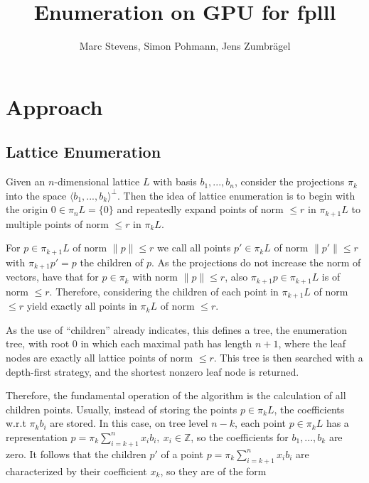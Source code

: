 \documentclass{scrartcl}
\title{Enumeration on GPU for fplll}
\author{Marc Stevens, Simon Pohmann, Jens Zumbrägel}
\newcommand{\Z}{\mathbb{Z}}
\begin{document}
    \maketitle

    \section{Approach}

    \subsection{Lattice Enumeration}

    Given an $n$-dimensional lattice $L$ with basis $b_1, ..., b_n$, consider the projections $\pi_k$ into the space $\langle b_1, ..., b_k \rangle^\perp$. Then the idea of lattice enumeration is to begin with the origin $0 \in \pi_n L = \{ 0 \}$ and repeatedly expand points of norm $\leq r$ in $\pi_{k + 1} L$ to multiple points of norm $\leq r$ in $\pi_k L$.
    
    For $p \in \pi_{k + 1} L$ of norm $\| p \| \leq r$ we call all points $p' \in \pi_k L$ of norm $\| p' \| \leq r$ with $\pi_{k + 1} p' = p$ the children of $p$. As the projections do not increase the norm of vectors, have that for $p \in \pi_k$ with norm $\| p \| \leq r$, also $\pi_{k + 1} p \in \pi_{k + 1}L$ is of norm $\leq r$. Therefore, considering the children of each point in $\pi_{k + 1}L$ of norm $\leq r$ yield exactly all points in $\pi_k L$ of norm $\leq r$.

    As the use of ``children'' already indicates, this defines a tree, the enumeration tree, with root $0$ in which each maximal path has length $n + 1$, where the leaf nodes are exactly all lattice points of norm $\leq r$.
    This tree is then searched with a depth-first strategy, and the shortest nonzero leaf node is returned.

    Therefore, the fundamental operation of the algorithm is the calculation of all children points. Usually, instead of storing the points $p \in \pi_k L$, the coefficients w.r.t $\pi_k b_i$ are stored. In this case, on tree level $n - k$, each point $p \in \pi_k L$ has a representation $p = \pi_k \sum_{i = k + 1}^n x_i b_i , \ x_i \in \Z$, so the coefficients for $b_1, ..., b_k$ are zero. It follows that the children $p'$ of a point $p = \pi_k \sum_{i = k + 1}^n x_i b_i$ are characterized by their coefficient $x_k$, so they are of the form
    
\end{document}
